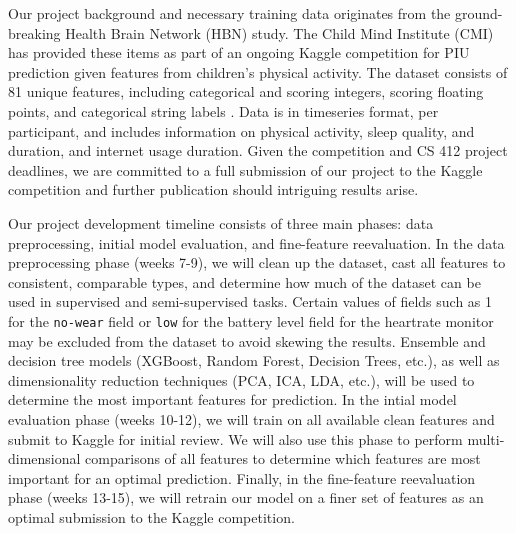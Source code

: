 \documentclass[11pt]{extarticle}
\begin{document}
Our project background and necessary training data originates from the ground-breaking Health Brain Network (HBN) study.
The Child Mind Institute (CMI) has provided these items as part of an ongoing Kaggle competition for PIU prediction given features from children's physical activity. 
The dataset consists of 81 unique features, including categorical and scoring integers, scoring floating points, and categorical string labels \cite{child-mind-institute-problematic-internet-use}.
Data is in timeseries format, per participant, and includes information on physical activity, sleep quality, and duration, and internet usage duration.
Given the competition and CS 412 project deadlines, we are committed to a full submission of our project to the Kaggle competition and further publication should intriguing results arise.

Our project development timeline consists of three main phases: data preprocessing, initial model evaluation, and fine-feature reevaluation.
In the data preprocessing phase (weeks 7-9), we will clean up the dataset, cast all features to consistent, comparable types, and determine how much of the dataset can be used in supervised and semi-supervised tasks. 
Certain values of fields such as 1 for the \texttt{no-wear} field or \texttt{low} for the battery level field for the heartrate monitor may be excluded from the dataset to avoid skewing the results.
Ensemble and decision tree models (XGBoost, Random Forest, Decision Trees, etc.), as well as dimensionality reduction techniques (PCA, ICA, LDA, etc.), will be used to determine the most important features for prediction.
In the intial model evaluation phase (weeks 10-12), we will train on all available clean features and submit to Kaggle for initial review. 
We will also use this phase to perform multi-dimensional comparisons of all features to determine which features are most important for an optimal prediction.
Finally, in the fine-feature reevaluation phase (weeks 13-15), we will retrain our model on a finer set of features as an optimal submission to the Kaggle competition.



\end{document}
